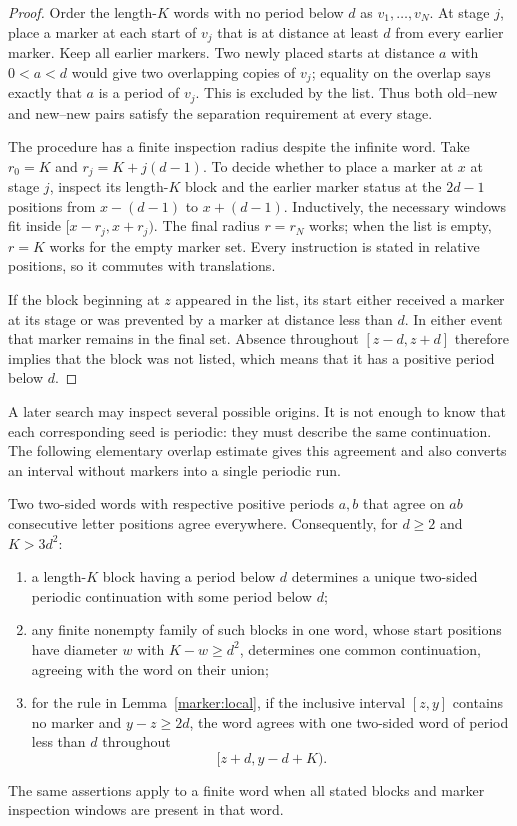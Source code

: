 \begin{proof}
Order the length-$K$ words with no period below $d$ as
$v_1,\ldots,v_N$. At stage $j$, place a marker at each start of $v_j$
that is at distance at least $d$ from every earlier marker. Keep all
earlier markers. Two newly placed starts at distance $a$ with
$0<a<d$ would give two overlapping copies of $v_j$; equality on the
overlap says exactly that $a$ is a period of $v_j$. This is excluded by
the list. Thus both old--new and new--new pairs satisfy the separation
requirement at every stage.

The procedure has a finite inspection radius despite the infinite word.
Take $r_0=K$ and $r_j=K+j(d-1)$. To decide whether to place a marker at
$x$ at stage $j$, inspect its length-$K$ block and the earlier marker
status at the $2d-1$ positions from $x-(d-1)$ to $x+(d-1)$. Inductively,
the necessary windows fit inside $[x-r_j,x+r_j)$. The final radius
$r=r_N$ works; when the list is empty, $r=K$ works for the empty marker
set. Every instruction is stated in relative positions, so it commutes
with translations.

If the block beginning at $z$ appeared in the list, its start either
received a marker at its stage or was prevented by a marker at distance
less than $d$. In either event that marker remains in the final set.
Absence throughout $[z-d,z+d]$ therefore implies that the block was not
listed, which means that it has a positive period below $d$.
\end{proof}

A later search may inspect several possible origins. It is not enough
to know that each corresponding seed is periodic: they must describe the
same continuation. The following elementary overlap estimate gives this
agreement and also converts an interval without markers into a single
periodic run.

\begin{lemma}\label{marker:periodic}
Two two-sided words with respective positive periods $a,b$ that agree
on $ab$ consecutive letter positions agree everywhere. Consequently,
for $d\ge2$ and $K>3d^2$:
\begin{enumerate}[label=\textup{(\roman*)}]
\item a length-$K$ block having a period below $d$ determines a
unique two-sided periodic continuation with some period below $d$;
\item any finite nonempty family of such blocks in one word, whose
start positions have diameter $w$ with $K-w\ge d^2$, determines
one common continuation, agreeing with the word on their union;
\item for the rule in Lemma~\ref{marker:local}, if the inclusive
interval $[z,y]$ contains no marker and $y-z\ge2d$, the word agrees
with one two-sided word of period less than $d$ throughout
\begin{equation}\label{marker:markerless-run}
                          [z+d,y-d+K).
\end{equation}
\end{enumerate}
The same assertions apply to a finite word when all stated blocks
and marker inspection windows are present in that word.
\end{lemma}


